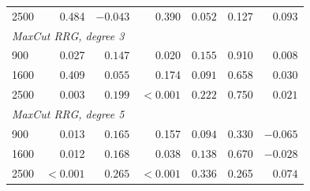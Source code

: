\documentclass[conference]{IEEEtran}
\begin{document}
\begin{table}[t]
\begin{tabular}{l rr rr rr}
    2500 & 0.484 & $-0.043$ & 0.390 & $0.052$ & 0.127 & $0.093$ \\
    \multicolumn{7}{l}{\textit{MaxCut RRG, degree 3}} \\
    900  & 0.027 & $0.147$ & 0.020 & $0.155$ & 0.910 & $0.008$ \\
    1600 & 0.409 & $0.055$ & 0.174 & $0.091$ & 0.658 & $0.030$ \\
    2500 & 0.003 & $0.199$ & $<0.001$ & $0.222$ & 0.750 & $0.021$ \\
    \multicolumn{7}{l}{\textit{MaxCut RRG, degree 5}} \\
    900  & 0.013 & $0.165$ & 0.157 & $0.094$ & 0.330 & $-0.065$ \\
    1600 & 0.012 & $0.168$ & 0.038 & $0.138$ & 0.670 & $-0.028$ \\
    2500 & $<0.001$ & $0.265$ & $<0.001$ & $0.336$ & 0.265 & $0.074$ \\
    \hline
  \end{tabular}
\end{table}

\FloatBarrier
\end{document}
